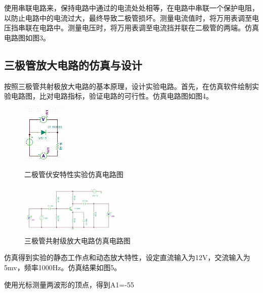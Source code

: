 \documentclass[]{article}
\begin{document}
使用串联电路来，保持电路中通过的电流处处相等，在电路中串联一个保护电阻，以防止电路中的电流过大，最终导致二极管损坏。测量电流值时，将万用表调至电压挡串联在电路中。测量电压时，将万用表调至电流挡并联在二极管的两端。仿真电路图如图3。



\subsection{三极管放大电路的仿真与设计}

按照三极管共射极放大电路的基本原理，设计实验电路。首先，在仿真软件绘制实验电路图，比对电路指标，验证电路的可行性。仿真电路图如图4。


\begin{figure}[h]
	\centering
	
	\begin{minipage}{0.4\linewidth}
		\centering
		\includegraphics[width=2cm]{img/4_1}
		\caption{二极管伏安特性实验仿真电路图}
	\end{minipage}
	\begin{minipage}{0.4\linewidth}
		\centering
		\includegraphics[width=5cm]{img/4_2}
		\caption{三极管共射级放大电路仿真电路图}
	\end{minipage}

\end{figure}


仿真得到实验的静态工作点和动态放大特性，设定直流输入为12V，交流输入为5mv，频率1000Hz。仿真结果如图5。

使用光标测量两波形的顶点，得到A1=-55
\end{document}
